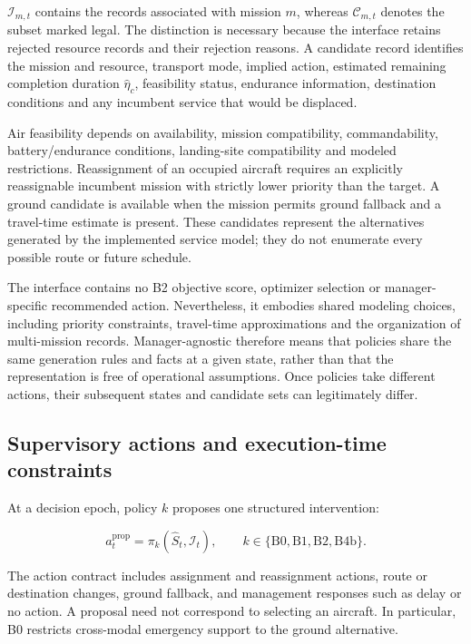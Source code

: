 \documentclass[]{interact}
\theoremstyle{plain}
\theoremstyle{definition}
\theoremstyle{remark}
\begin{document}
$\mathcal I_{m,t}$ contains the records associated with mission $m$, whereas $\mathcal C_{m,t}$ denotes the subset marked legal. The distinction is necessary because the interface retains rejected resource records and their rejection reasons. A candidate record identifies the mission and resource, transport mode, implied action, estimated remaining completion duration $\widehat\eta_c$, feasibility status, endurance information, destination conditions and any incumbent service that would be displaced.

Air feasibility depends on availability, mission compatibility, commandability, battery/endurance conditions, landing-site compatibility and modeled restrictions. Reassignment of an occupied aircraft requires an explicitly reassignable incumbent mission with strictly lower priority than the target. A ground candidate is available when the mission permits ground fallback and a travel-time estimate is present. These candidates represent the alternatives generated by the implemented service model; they do not enumerate every possible route or future schedule.

The interface contains no B2 objective score, optimizer selection or manager-specific recommended action. Nevertheless, it embodies shared modeling choices, including priority constraints, travel-time approximations and the organization of multi-mission records. Manager-agnostic therefore means that policies share the same generation rules and facts at a given state, rather than that the representation is free of operational assumptions. Once policies take different actions, their subsequent states and candidate sets can legitimately differ.

\subsection{Supervisory actions and execution-time constraints}

At a decision epoch, policy $k$ proposes one structured intervention:

\begin{equation*}
a_t^{\mathrm{prop}}=\pi_k(\widehat S_t,\mathcal I_t),\qquad
k\in\{\mathrm{B0,B1,B2,B4b}\}. \tag{4}
\end{equation*}

The action contract includes assignment and reassignment actions, route or destination changes, ground fallback, and management responses such as delay or no action. A proposal need not correspond to selecting an aircraft. In particular, B0 restricts cross-modal emergency support to the ground alternative.
\end{document}

